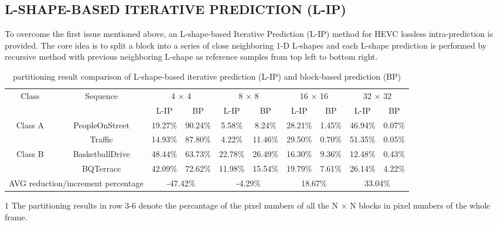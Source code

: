 \documentclass[journal]{IEEEtran}
\begin{document}
\subsection{L-SHAPE-BASED ITERATIVE PREDICTION (L-IP)}
To overcome the first issue mentioned above, an L-shape-based Iterative Prediction (L-IP) method for HEVC lossless intra-prediction is provided. The core idea is to split a block into a series of close neighboring 1-D L-shapes and each L-shape prediction is performed by recursive method with previous neighboring L-shape as reference samples from top left to bottom right.

\begin{table}[]
\centering
\caption{partitioning result comparison of L-shape-based iterative prediction (L-IP) and block-based prediction (BP)}
\label{table: partitioning result}
\begin{tabular}{c|c|cc|cc|cc|cc}
\toprule
\multirow{2}{*}{Class}    & \multirow{2}{*}{Sequence}   & \multicolumn{2}{c|}{4 × 4}      & \multicolumn{2}{c|}{8 × 8}     & \multicolumn{2}{c|}{16 × 16}   & \multicolumn{2}{c}{32 × 32}   \\
                          &                             & L-IP           & BP           & L-IP          & BP           & L-IP          & BP           & L-IP          & BP          \\ \hline
\multirow{2}{*}{Class A}   & PeopleOnStreet              & 19.27\%        & 90.24\%      & 5.58\%        & 8.24\%       & 28.21\%       & 1.45\%       & 46.94\%       & 0.07\%      \\
                          & Traffic                     & 14.93\%        & 87.80\%      & 4.22\%        & 11.46\%      & 29.50\%       & 0.70\%       & 51.35\%       & 0.05\%      \\ \hline
\multirow{2}{*}{Class B}   & BasketballDrive             & 48.44\%        & 63.73\%      & 22.78\%       & 26.49\%      & 16.30\%       & 9.36\%       & 12.48\%       & 0.43\%      \\
                          & BQTerrace                   & 42.09\%        & 72.62\%      & 11.98\%       & 15.54\%      & 19.79\%       & 7.61\%       & 26.14\%       & 4.22\%      \\ \hline
\multicolumn{2}{c|}{AVG reduction/increment percentage} & \multicolumn{2}{c|}{-47.42\%} & \multicolumn{2}{c|}{-4.29\%} & \multicolumn{2}{c|}{18.67\%} & \multicolumn{2}{c}{33.04\%} \\ \bottomrule
\end{tabular}
\begin{tablenotes}
       \footnotesize
       \item[1]The partitioning results  in row 3-6 denote the percantage of the   pixel numbers of all the N × N blocks in  pixel numbers of the whole frame.
     \end{tablenotes}
\end{table}
\end{document}
